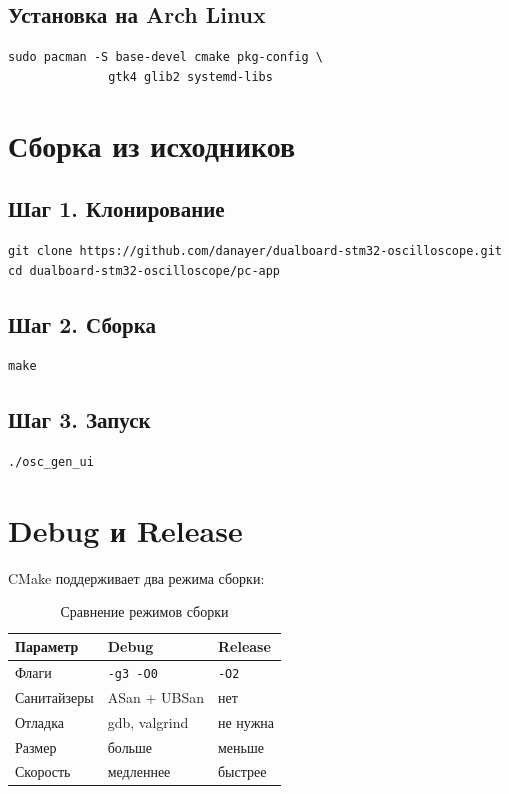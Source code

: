 \subsection{Установка на Arch Linux}

\begin{verbatim}
sudo pacman -S base-devel cmake pkg-config \
              gtk4 glib2 systemd-libs
\end{verbatim}

\section{Сборка из исходников}

\subsection{Шаг 1. Клонирование}

\begin{verbatim}
git clone https://github.com/danayer/dualboard-stm32-oscilloscope.git
cd dualboard-stm32-oscilloscope/pc-app
\end{verbatim}

\subsection{Шаг 2. Сборка}

\begin{verbatim}
make
\end{verbatim}

\subsection{Шаг 3. Запуск}

\begin{verbatim}
./osc_gen_ui
\end{verbatim}

\section{Debug и Release}

CMake поддерживает два режима сборки:

\begin{table}[htbp]
\centering
\caption{Сравнение режимов сборки}
\label{tab:build-modes}
\small
\begin{tabularx}{\textwidth}{@{}l L L@{}}
\toprule
\textbf{Параметр} & \textbf{Debug} & \textbf{Release} \\
\midrule
Флаги        & \texttt{-g3 -O0} & \texttt{-O2} \\
Санитайзеры  & ASan + UBSan & нет \\
Отладка      & gdb, valgrind & не нужна \\
Размер       & больше & меньше \\
Скорость     & медленнее & быстрее \\
\bottomrule
\end{tabularx}
\end{table}

